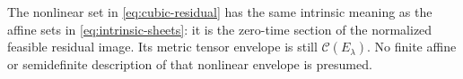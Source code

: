 The nonlinear set in \eqref{eq:cubic-residual} has the same intrinsic meaning
as the affine sets in \eqref{eq:intrinsic-sheets}: it is the zero-time section
of the normalized feasible residual image. Its metric tensor envelope is
still $\mathcal C(E_\lambda)$. No finite affine or semidefinite description
of that nonlinear envelope is presumed.
